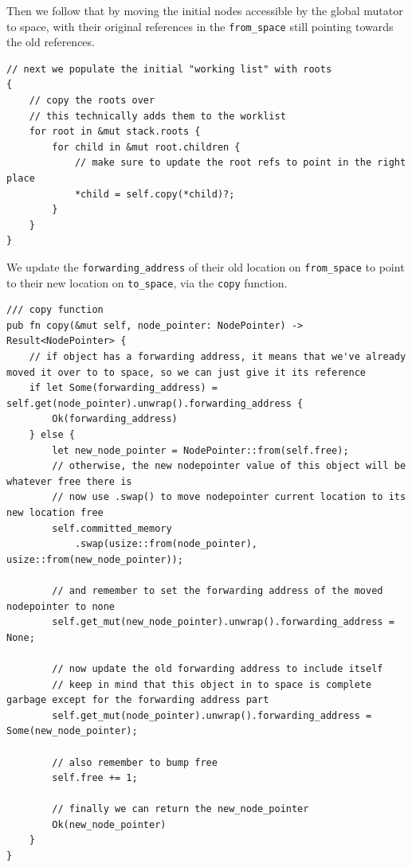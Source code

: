 \documentclass[index]{subfiles}
\begin{document}
Then we follow that by moving the initial nodes accessible by the global mutator to space, with their original references in the \verb+from_space+ still pointing towards the old references.

\begin{verbatim}
// next we populate the initial "working list" with roots
{
    // copy the roots over
    // this technically adds them to the worklist
    for root in &mut stack.roots {
        for child in &mut root.children {
            // make sure to update the root refs to point in the right place
            *child = self.copy(*child)?;
        }
    }
}
\end{verbatim}

We update the \verb+forwarding_address+ of their old location on \verb+from_space+ to point to their new location on \verb+to_space+, via the \verb+copy+ function.

\begin{verbatim}
/// copy function
pub fn copy(&mut self, node_pointer: NodePointer) -> Result<NodePointer> {
    // if object has a forwarding address, it means that we've already moved it over to to space, so we can just give it its reference
    if let Some(forwarding_address) = self.get(node_pointer).unwrap().forwarding_address {
        Ok(forwarding_address)
    } else {
        let new_node_pointer = NodePointer::from(self.free);
        // otherwise, the new nodepointer value of this object will be whatever free there is
        // now use .swap() to move nodepointer current location to its new location free
        self.committed_memory
            .swap(usize::from(node_pointer), usize::from(new_node_pointer));

        // and remember to set the forwarding address of the moved nodepointer to none
        self.get_mut(new_node_pointer).unwrap().forwarding_address = None;

        // now update the old forwarding address to include itself
        // keep in mind that this object in to space is complete garbage except for the forwarding address part
        self.get_mut(node_pointer).unwrap().forwarding_address = Some(new_node_pointer);

        // also remember to bump free
        self.free += 1;

        // finally we can return the new_node_pointer
        Ok(new_node_pointer)
    }
}
\end{verbatim}
\end{document}
